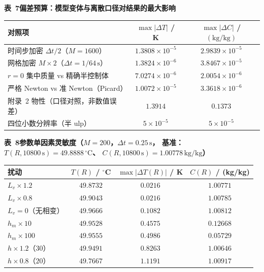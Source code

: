 \documentclass[withoutpreface,bwprint]{cumcmthesis} %
\begin{document}
\begin{table}[htbp]
\centering
\begin{minipage}{0.94\textwidth}
\centering\small
\textbf{表~7\quad 偏差预算：模型变体与离散口径对结果的最大影响}\\[3pt]
\begin{tabular}{lcc}
\toprule
对照项 & $\max|\Delta T|$ / K & $\max|\Delta C|$ / $(\mathrm{kg/kg})$ \\
\midrule
时间步加密 $\Delta t/2$（$M=1600$） & $1.3808\times10^{-5}$ & $2.9839\times10^{-5}$ \\
网格加密 $M\times2$（$\Delta t=1/64\,\mathrm{s}$） & $1.3824\times10^{-6}$ & $3.8467\times10^{-5}$ \\
$r=0$ 集中质量 vs 精确半控制体 & $7.0274\times10^{-6}$ & $2.0054\times10^{-6}$ \\
严格 Newton vs 准 Newton（Picard） & $1.0072\times10^{-5}$ & $3.3618\times10^{-6}$ \\
附录~2 物性（口径对照，非数值误差） & $1.3914$ & $0.1373$ \\
\midrule
四位小数分辨率（半 ulp） & $5\times10^{-5}$ & $5\times10^{-5}$ \\
\bottomrule
\end{tabular}
\end{minipage}
\end{table}

\begin{table}[htbp]
\centering
\begin{minipage}{0.94\textwidth}
\centering\small
\textbf{表~8\quad 参数单因素灵敏度（$M=200$，$\Delta t=0.25\,\mathrm{s}$，
基准：$T(R,10800\,\mathrm{s})=49.8888\,^\circ\mathrm{C}$、
$C(R,10800\,\mathrm{s})=1.00778\,\mathrm{kg/kg}$）}\\[3pt]
\begin{tabular}{lccc}
\toprule
扰动 & $T(R)$ / $^\circ$C & $\max|\Delta T(R)|$ / K & $C(R)$ / (kg/kg) \\
\midrule
$L_v\times1.2$ & $49.8732$ & $0.0216$ & $1.00771$ \\
$L_v\times0.8$ & $49.9043$ & $0.0216$ & $1.00785$ \\
$L_v=0$（无相变） & $49.9666$ & $0.1082$ & $1.00812$ \\
$h_m\times10$ & $49.9528$ & $0.4575$ & $\mathbf{0.12668}$ \\
$h_m\times100$ & $49.9555$ & $0.4986$ & $\mathbf{0.05729}$ \\
$h\times1.2$（$30$） & $49.9491$ & $0.8263$ & $1.00646$ \\
$h\times0.8$（$20$） & $49.7667$ & $1.1191$ & $1.00917$ \\
\bottomrule
\end{tabular}
\end{minipage}
\end{table}
\end{document}
